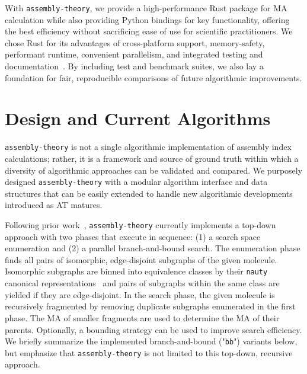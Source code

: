 \documentclass[acmsmall,nonacm,screen]{acmart}  %
\begin{document}
With \texttt{assembly-theory}, we provide a high-performance Rust package for MA calculation while also providing Python bindings for key functionality, offering the best efficiency without sacrificing ease of use for scientific practitioners.
We chose Rust for its advantages of cross-platform support, memory-safety, performant runtime, convenient parallelism, and integrated testing and documentation~\cite{Perkel2020-whyscientists}.
By including test and benchmark suites, we also lay a foundation for fair, reproducible comparisons of future algorithmic improvements.





\section{Design and Current Algorithms} \label{sec:design}

\texttt{assembly-theory} is not a single algorithmic implementation of assembly index calculations; rather, it is a framework and source of ground truth within which a diversity of algorithmic approaches can be validated and compared.
We purposely designed \texttt{assembly-theory} with a modular algorithm interface and data structures that can be easily extended to handle new algorithmic developments introduced as AT matures.

Following prior work~\cite{Marshall2021-identifyingmolecules,Jirasek2024-investigatingquantifying,Seet2024-rapidcomputation}, \texttt{assembly-theory} currently implements a top-down approach with two phases that execute in sequence: (1) a search space enumeration and (2) a parallel branch-and-bound search.
The enumeration phase finds all pairs of isomorphic, edge-disjoint subgraphs of the given molecule.
Isomorphic subgraphs are binned into equivalence classes by their \texttt{nauty} canonical representations~\cite{McKay2014-practicalgraph} and pairs of subgraphs within the same class are yielded if they are edge-disjoint.
In the search phase, the given molecule is recursively fragmented by removing duplicate subgraphs enumerated in the first phase.
The MA of smaller fragments are used to determine the MA of their parents.
Optionally, a bounding strategy can be used to improve search efficiency.
We briefly summarize the implemented branch-and-bound ("\texttt{bb}") variants below, but emphasize that \texttt{assembly-theory} is not limited to this top-down, recursive approach.
\end{document}
